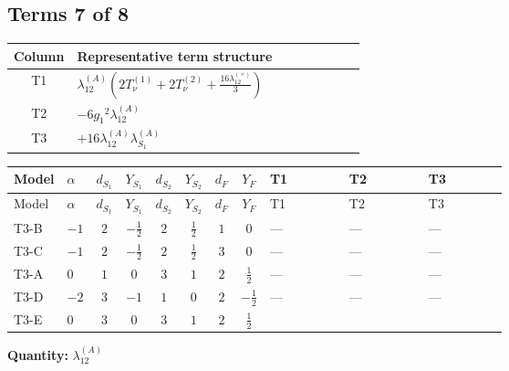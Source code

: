 \documentclass[8pt]{article}
\begin{document}
\begin{landscape}
\subsection*{Terms 7 of 8}
\begin{center}
\begin{tabular}{@{}c >{\raggedright\arraybackslash}p{0.82\linewidth}@{}}
\toprule
Column & Representative term structure \\
\midrule
T1 & \(\displaystyle {\lambda_{12}^{(A)}} \left(2 T_{\nu}^{(1)}+2 T_{\nu}^{(2)}+\frac{16 {\lambda_{12}^{(\times)}}}{3}\right)\) \\
\midrule
T2 & \(\displaystyle -6 {g_1}^2 {\lambda_{12}^{(A)}}\) \\
\midrule
T3 & \(\displaystyle +16 {\lambda_{12}^{(A)}} {\lambda_{S_1}^{(A)}}\) \\
\midrule
\bottomrule
\end{tabular}
\end{center}
\smallskip
\tiny
\begin{longtable}{@{}llcccccc >{\raggedright\arraybackslash}p{0.21\linewidth} >{\raggedright\arraybackslash}p{0.21\linewidth} >{\raggedright\arraybackslash}p{0.21\linewidth}@{}}
\toprule
Model & $\alpha$ & $d_{S_1}$ & $Y_{S_1}$ & $d_{S_2}$ & $Y_{S_2}$ & $d_F$ & $Y_F$ & T1 & T2 & T3 \\
\midrule
\endfirsthead
\toprule
Model & $\alpha$ & $d_{S_1}$ & $Y_{S_1}$ & $d_{S_2}$ & $Y_{S_2}$ & $d_F$ & $Y_F$ & T1 & T2 & T3 \\
\midrule
\endhead
T3-B & $-1$ & $2$ & $-\frac{1}{2}$ & $2$ & $\frac{1}{2}$ & $1$ & $0$ & --- & --- & --- \\
\midrule
T3-C & $-1$ & $2$ & $-\frac{1}{2}$ & $2$ & $\frac{1}{2}$ & $3$ & $0$ & --- & --- & --- \\
\midrule
T3-A & $0$ & $1$ & $0$ & $3$ & $1$ & $2$ & $\frac{1}{2}$ & --- & --- & --- \\
\midrule
T3-D & $-2$ & $3$ & $-1$ & $1$ & $0$ & $2$ & $-\frac{1}{2}$ & --- & --- & --- \\
\midrule
T3-E & $0$ & $3$ & $0$ & $3$ & $1$ & $2$ & $\frac{1}{2}$ & \scriptsize\adjustbox{max width=\linewidth}{$\begin{gathered} {\lambda_{12}^{(A)}} \left(2 T_{\nu}^{(1)}+2 T_{\nu}^{(2)}+\frac{16 {\lambda_{12}^{(\times)}}}{3}\right)\end{gathered}$} & \scriptsize\adjustbox{max width=\linewidth}{$\begin{gathered} -6 {g_1}^2 {\lambda_{12}^{(A)}}\end{gathered}$} & \scriptsize\adjustbox{max width=\linewidth}{$\begin{gathered} +16 {\lambda_{12}^{(A)}} {\lambda_{S_1}^{(A)}}\end{gathered}$} \\
\midrule
\bottomrule
\end{longtable}
\clearpage
\noindent\textbf{Quantity: }$\lambda_{12}^{(A)}$\par\smallskip

\end{landscape}
\end{document}
